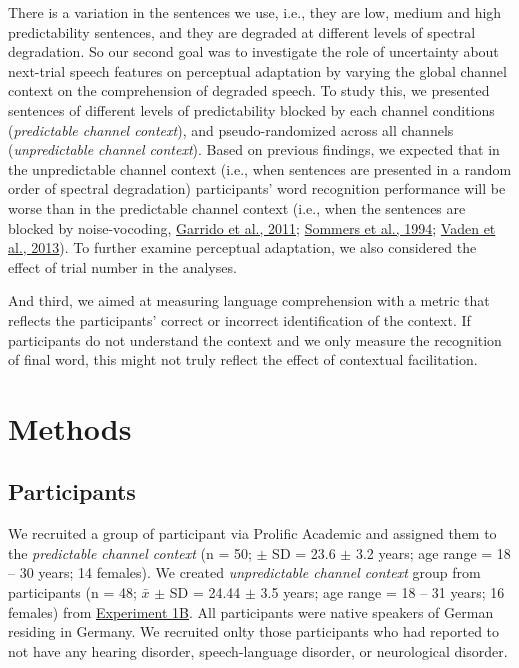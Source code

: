 \documentclass[a4paper, nobind]{templates/ociamthesis}
\begin{document}
There is a variation in the sentences we use, i.e., they are low, medium and high predictability sentences, and they are degraded at different levels of spectral degradation.
So our second goal was to investigate the role of uncertainty about next-trial speech features on perceptual adaptation by varying the global channel context on the comprehension of degraded speech.
To study this, we presented sentences of different levels of predictability blocked by each channel conditions (\emph{predictable channel context}), and pseudo-randomized across all channels (\emph{unpredictable channel context}).
Based on previous findings, we expected that in the unpredictable channel context (i.e., when sentences are presented in a random order of spectral degradation) participants' word recognition performance will be worse than in the predictable channel context (i.e., when the sentences are blocked by noise-vocoding, \protect\hyperlink{ref-Garrido2011}{Garrido et al., 2011}; \protect\hyperlink{ref-Sommers1994}{Sommers et al., 1994}; \protect\hyperlink{ref-Vaden2013}{Vaden et al., 2013}).
To further examine perceptual adaptation, we also considered the effect of trial number in the analyses.

And third, we aimed at measuring language comprehension with a metric that reflects the participants' correct or incorrect identification of the context.
If participants do not understand the context and we only measure the recognition of final word, this might not truly reflect the effect of contextual facilitation.

\hypertarget{methods-2}{%
\section{Methods}\label{methods-2}}

\hypertarget{participants-1}{%
\subsection{Participants}\label{participants-1}}

We recruited a group of participant via Prolific Academic and assigned them to the \emph{predictable channel context} (n = 50; \(\pm\) SD = 23.6 \(\pm\) 3.2 years; age range = 18 -- 30 years; 14 females).
We created \emph{unpredictable channel context} group from participants (n = 48; \(\bar{x}\) \(\pm\) SD = 24.44 \(\pm\) 3.5 years; age range = 18 -- 31 years; 16 females) from \protect\hyperlink{experiment1b}{Experiment 1B}.
All participants were native speakers of German residing in Germany.
We recruited onlty those participants who had reported to not have any hearing disorder, speech-language disorder, or neurological disorder.
\end{document}
